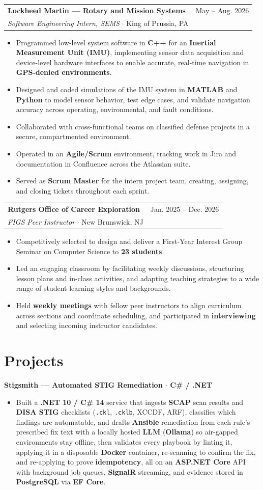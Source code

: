 \documentclass[10pt, letterpaper]{article}
\makeatletter
\newcommand{\resumeItem}[1]{\item \small #1}
\newcommand{\jobentry}[4]{%
  \noindent
  \begin{tabularx}{\linewidth}{@{}X r@{}}
    \textbf{\small #1} & \small #4 \\
    \textit{\small #2} $\cdot$ \small #3 & \\
  \end{tabularx}
  \vspace{-6pt}
}
\newcommand{\projectentry}[2]{%
  \noindent\textbf{\small #1} \hfill \small #2\nopagebreak\vspace{-2pt}
}
\makeatother
\begin{document}
\vspace{1pt}
\jobentry{Lockheed Martin --- Rotary and Mission Systems}{Software Engineering Intern, SEMS}{King of Prussia, PA}{May -- Aug. 2026}
\begin{itemize}
  \resumeItem{Programmed low-level system software in \textbf{C++} for an \textbf{Inertial Measurement Unit (IMU)}, implementing sensor data acquisition and device-level hardware interfaces to enable accurate, real-time navigation in \textbf{GPS-denied environments}.}
  \resumeItem{Designed and coded simulations of the IMU system in \textbf{MATLAB} and \textbf{Python} to model sensor behavior, test edge cases, and validate navigation accuracy across operating, environmental, and fault conditions.}
  \resumeItem{Collaborated with cross-functional teams on classified defense projects in a secure, compartmented environment.}
  \resumeItem{Operated in an \textbf{Agile/Scrum} environment, tracking work in Jira and documentation in Confluence across the Atlassian suite.}
  \resumeItem{Served as \textbf{Scrum Master} for the intern project team, creating, assigning, and closing tickets throughout each sprint.}
\end{itemize}

\vspace{1pt}
\jobentry{Rutgers Office of Career Exploration}{FIGS Peer Instructor}{New Brunswick, NJ}{Jan. 2025 -- Dec. 2026}
\begin{itemize}
  \resumeItem{Competitively selected to design and deliver a First-Year Interest Group Seminar on Computer Science to \textbf{23 students}.}
  \resumeItem{Led an engaging classroom by facilitating weekly discussions, structuring lesson plans and in-class activities, and adapting teaching strategies to a wide range of student learning styles and backgrounds.}
  \resumeItem{Held \textbf{weekly meetings} with fellow peer instructors to align curriculum across sections and coordinate scheduling, and participated in \textbf{interviewing} and selecting incoming instructor candidates.}
\end{itemize}

\section{Projects}

\projectentry{Stigsmith --- Automated STIG Remediation \textnormal{\small $\cdot$ C\# / .NET}}{}
\begin{itemize}
  \resumeItem{Built a \textbf{.NET 10 / C\# 14} service that ingests \textbf{SCAP} scan results and \textbf{DISA STIG} checklists (\texttt{.ckl}, \texttt{.cklb}, XCCDF, ARF), classifies which findings are automatable, and drafts \textbf{Ansible} remediation from each rule's prescribed fix text with a locally hosted \textbf{LLM} (\textbf{Ollama}) so air-gapped environments stay offline, then validates every playbook by linting it, applying it in a disposable \textbf{Docker} container, re-scanning to confirm the fix, and re-applying to prove \textbf{idempotency}, all on an \textbf{ASP.NET Core} API with background job queues, \textbf{SignalR} streaming, and evidence stored in \textbf{PostgreSQL} via \textbf{EF Core}.}
\end{itemize}
\end{document}
